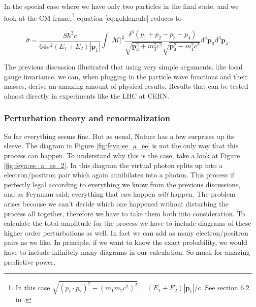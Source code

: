 In the special case where we have only two particles in the final state, and we look at the CM frame,\footnote{In this case $\sqrt{(p_1\cdot p_2)^2 - (m_1m_2 c^2)^2} = (E_1+E_2)|\mathbf{p}_1|/c$. See section 6.2 in \cite{griffiths1987iep}.} equation \eqref{eq:goldenrule} reduces to \cite{griffiths1987iep}

\begin{equation}
	\hat \sigma = \frac{S\hbar^2c}{64\pi^2(E_1+E_2)|\mathbf{p}_1|} \int | \mathcal{M} |^2
	\frac{\delta^4(p_1+p_2-p_3-p_4)}{\sqrt{\mathbf{p}_3^2+m_3^2c^2}\sqrt{\mathbf{p}_4^2+m_4^2c^2}} \textrm{d}^3\mathbf{p}_3\textrm{d}^3\mathbf{p}_4.
\end{equation}

The previous discussion illustrated that using very simple arguments, like local gauge invariance, we can, when plugging in the particle wave functions and their masses, derive an amazing amount of physical results. Results that can be tested almost directly in experiments like the LHC at CERN.

\subsubsection{Perturbation theory and renormalization}
So far everything seems fine. But as usual, Nature has a few surprises up its sleeve. The diagram in Figure \ref{fig:feyn:ee_a_ee} is not the only way that this process can happen. To understand why this is the case, take a look at Figure \ref{fig:feyn:ee_a_ee_2}. In this diagram the virtual photon splits up into a electron/positron pair which again annihilates into a photon. This process if perfectly legal according to everything we know from the previous discussions, and as Feynman said; everything that \emph{can} happen \emph{will} happen. The problem arises because we can't decide which one happened without disturbing the process all together, therefore we have to take them both into consideration. To calculate the total amplitude for the process we have to include diagrams of these higher order perturbations as well. In fact we can add as many electron/positron pairs as we like. In principle, if we want to know the exact probability, we would have to include infinitely many diagrams in our calculation. So much for amazing predictive power.

